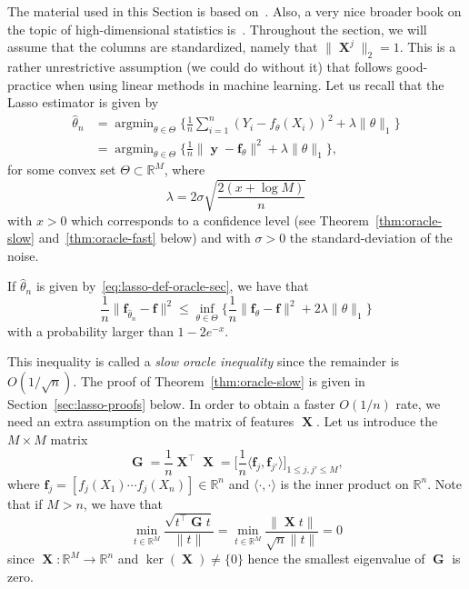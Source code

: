\documentclass[
	fontsize=11pt, %
	twoside=false, %
	numbers=noenddot, %
]{kaobook}
\DeclareMathOperator{\bG}{{\boldsymbol G}}
\DeclareMathOperator{\bX}{{\boldsymbol X}}
\renewcommand{\bf}{{\boldsymbol f}}
\DeclareMathOperator{\by}{{\boldsymbol y}}
\DeclareMathOperator*{\argmin}{argmin}
\newcommand{\R}{\mathbb R}
\newcommand{\wh}{\widehat}
\newcommand{\norm}[1]{\| #1 \|}
\newcommand{\inr}[1]{\langle #1 \rangle}
\begin{document}
The material used in this Section is based on~.
Also, a very nice broader book on the topic of high-dimensional statistics is~\cite{giraud2014introduction}.
Throughout the section, we will assume that the columns are standardized, namely that $\norm{\bX^j}_2 = 1$.
This is a rather unrestrictive assumption (we could do without it) that follows good-practice when using linear methods in machine learning.
Let us recall that the Lasso estimator is given by
\begin{equation}
	\label{eq:lasso-def-oracle-sec}
	\begin{split}
	\wh \theta_n &= \argmin_{\theta \in \Theta} \Big\{ \frac 1n \sum_{i=1}^n (Y_i - f_\theta(X_i))^2 + \lambda \norm{\theta}_1 \Big\} \\
	&= \argmin_{\theta \in \Theta} \Big\{ 
	\frac 1n \norm{\by - \bf_\theta}^2 + \lambda \norm{\theta}_1 
	\Big\},
	\end{split}
\end{equation}
for some convex set $\Theta \subset \R^M$, where 
\begin{equation*}
	\lambda = 2 \sigma \sqrt{\frac{2(x + \log M)}{n}}
\end{equation*}
with $x > 0$ which corresponds to a confidence level (see Theorem~\ref{thm:oracle-slow} and~\ref{thm:oracle-fast} below) and with $\sigma > 0$ the standard-deviation of the noise.
\begin{theorem}
	\label{thm:oracle-slow}
	If $\wh \theta_n$ is given by~\eqref{eq:lasso-def-oracle-sec}, we have that
	\begin{equation*}
		\frac 1n \norm{\bf_{\wh \theta_n} - \bf}^2 \leq \inf_{\theta \in \Theta} 
		\Big\{ \frac 1n \norm{\bf_{\theta} - \bf}^2  + 2 \lambda \norm{\theta}_1 \Big\}
	\end{equation*}
	with a probability larger than $1 - 2 e^{-x}$.
\end{theorem}
This inequality is called a \emph{slow oracle inequality} since the remainder is $O(1 / \sqrt{n})$.
The proof of Theorem~\ref{thm:oracle-slow} is given in Section~\ref{sec:lasso-proofs} below.
In order to obtain a faster $O(1 / n)$ rate, we need an extra assumption on the matrix of features $\bX$.
Let us introduce the $M \times M$ matrix 
\begin{equation*}
	\bG = \frac 1n \bX^\top \bX = 
	\Big[ \frac 1n \inr{\bf_j, \bf_{j'}} \Big]_{1 \leq j, j' \leq M},
\end{equation*}
where $\bf_j = [f_j(X_1) \cdots f_j(X_n)] \in \R^n$ and $\inr{\cdot, \cdot}$ is the inner product on $\R^n$.
Note that if $M > n$, we have that
\begin{equation*}
	\min_{t \in \R^M} \frac{\sqrt{t^\top \bG t}}{\norm{t}} 
	= \min_{t \in \R^M} \frac{\norm{\bX t}}{\sqrt n \norm{t}} = 0
\end{equation*}
since $\bX : \R^M \rightarrow \R^n$ and $\ker(\bX) \neq \{ 0 \}$ hence the smallest eigenvalue of $\bG$ is zero.
\end{document}
